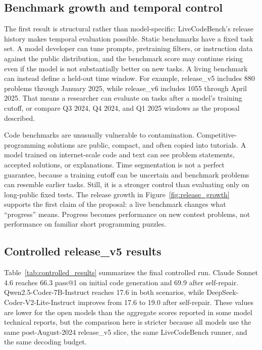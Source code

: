 \documentclass[11pt]{article}
\makeatletter
\newcommand{\lcb}{LiveCodeBench}
\newcommand{\passone}{pass@1}
\makeatother
\begin{document}
\subsection{Benchmark growth and temporal control}
The first result is structural rather than model-specific: \lcb{}'s release history makes temporal evaluation possible. Static benchmarks have a fixed task set. A model developer can tune prompts, pretraining filters, or instruction data against the public distribution, and the benchmark score may continue rising even if the model is not substantially better on new tasks. A living benchmark can instead define a held-out time window. For example, release\_v5 includes 880 problems through January 2025, while release\_v6 includes 1055 through April 2025. That means a researcher can evaluate on tasks after a model's training cutoff, or compare Q3 2024, Q4 2024, and Q1 2025 windows as the proposal described.

Code benchmarks are unusually vulnerable to contamination. Competitive-programming solutions are public, compact, and often copied into tutorials. A model trained on internet-scale code and text can see problem statements, accepted solutions, or explanations. Time segmentation is not a perfect guarantee, because a training cutoff can be uncertain and benchmark problems can resemble earlier tasks. Still, it is a stronger control than evaluating only on long-public fixed tests. The release growth in Figure~\ref{fig:release_growth} supports the first claim of the proposal: a live benchmark changes what ``progress'' means. Progress becomes performance on new contest problems, not performance on familiar short programming puzzles.

\subsection{Controlled release\_v5 results}
Table~\ref{tab:controlled_results} summarizes the final controlled run. Claude Sonnet 4.6 reaches 66.3 \passone{} on initial code generation and 69.9 after self-repair. Qwen2.5-Coder-7B-Instruct reaches 17.6 in both scenarios, while DeepSeek-Coder-V2-Lite-Instruct improves from 17.6 to 19.0 after self-repair. These values are lower for the open models than the aggregate scores reported in some model technical reports, but the comparison here is stricter because all models use the same post-August-2024 release\_v5 slice, the same \lcb{} runner, and the same decoding budget.
\end{document}
